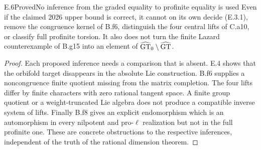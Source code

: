 \begin{claim}{E.6}{Proved}{No inference from the graded equality to profinite equality is used}
Even if the claimed 2026 upper bound is correct, it cannot on its own
decide (E.3.1), remove the congruence kernel of B.f6, distinguish the
four central lifts of C.a10, or classify full profinite torsion. It
also does not turn the finite Lazard counterexample of B.g15 into an
element of $\widehat{\mathrm{GT}}_0\setminus\widehat{\mathrm{GT}}$.
\end{claim}

\begin{proof}
Each proposed inference needs a comparison that is absent. E.4 shows
that the orbifold target disappears in the absolute Lie construction.
B.f6 supplies a noncongruence finite quotient missing from the matrix
completion. The four lifts differ by finite characters with zero
rational tangent space. A finite group quotient or a weight-truncated
Lie algebra does not produce a compatible inverse system of lifts.
Finally B.f8 gives an explicit endomorphism which is an automorphism
in every nilpotent and pro-$\ell$ realization but not in the full
profinite one. These are concrete obstructions to the respective
inferences, independent of the truth of the rational dimension theorem.
\end{proof}
